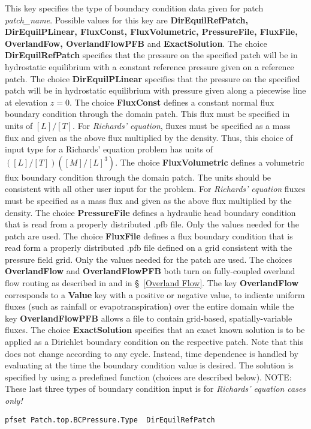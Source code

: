{This key specifies the type of boundary condition data given for patch 
{\em patch\_name}.  Possible values for this key are {\bf DirEquilRefPatch, 
DirEquilPLinear, FluxConst, FluxVolumetric, PressureFile, FluxFile, OverlandFow, OverlandFlowPFB} and 
{\bf ExactSolution}.  The choice {\bf DirEquilRefPatch} specifies that the
pressure on the specified patch will be in hydrostatic equilibrium with a
constant reference pressure given on a reference patch.
The choice {\bf DirEquilPLinear} specifies that the pressure on the specified
patch will be in hydrostatic equilibrium with pressure given along a piecewise
line at elevation $z=0$.  The choice {\bf FluxConst} defines a constant normal 
flux boundary condition through the domain patch.  
This flux must be specified in units of $[L]/[T]$.
For {\em Richards' equation}, fluxes must be specified as a mass flux and given
as the above flux multiplied by the density.  Thus, this choice of input type
for a Richards' equation problem has units of $([L]/[T])([M]/[L]^3)$.
The choice {\bf FluxVolumetric} defines a volumetric flux boundary condition
through the domain patch.  The units should be consistent with all other
user input for the problem.
For {\em Richards' equation} fluxes must be specified as a mass flux and given
as the above flux multiplied by the density.
The choice {\bf PressureFile} defines a hydraulic head boundary condition that
is read from a properly distributed .pfb file.  Only the values needed for the
patch are used.
The choice {\bf FluxFile} defines a flux boundary condition that is read form a
properly distributed .pfb file defined on a grid consistent with the pressure
field grid.  Only the values needed for the patch are used.
The choices {\bf OverlandFlow} and {\bf OverlandFlowPFB} both turn on 
fully-coupled overland flow routing as described in \cite{KM06} and in \S~\ref{Overland Flow}.  
The key {\bf OverlandFlow} corresponds to a {\bf Value} key with a positive or negative value, 
to indicate uniform fluxes (such as rainfall or evapotranspiration) over the entire domain 
while the key {\bf OverlandFlowPFB} allows a  file to contain grid-based, 
spatially-variable fluxes.
The choice {\bf ExactSolution} specifies that an exact known solution 
is to be applied as a
Dirichlet boundary condition on the respective patch.  Note that this does not
change according to any cycle.  Instead, time dependence is handled by
evaluating at the time the boundary condition value is desired.  
The solution is specified by using a predefined function (choices are described
below).  NOTE: These last three types of boundary condition input is for 
{\em Richards' equation cases only!} 
}
\begin{display}\begin{verbatim}
pfset Patch.top.BCPressure.Type  DirEquilRefPatch
\end{verbatim}\end{display}

